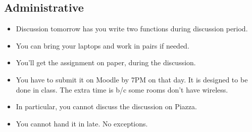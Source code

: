 \documentclass{book}
\begin{document}


\newlecture

\begin{instructor}
\section{Administrative}

\begin{itemize}

  \item Discussion tomorrow has you write two functions during discussion period.

  \item You can bring your laptops and work in pairs if needed.

  \item You'll get the assignment on paper, during the discussion.

  \item You have to submit it on Moodle by 7PM on that day. It is designed
  to be done in class. The extra time is b/c some rooms don't have wireless.

  \item In particular, you cannot discuss the discussion on Piazza.

  \item You cannot hand it in late. No exceptions.

\end{itemize}

\end{instructor}
\end{document}
